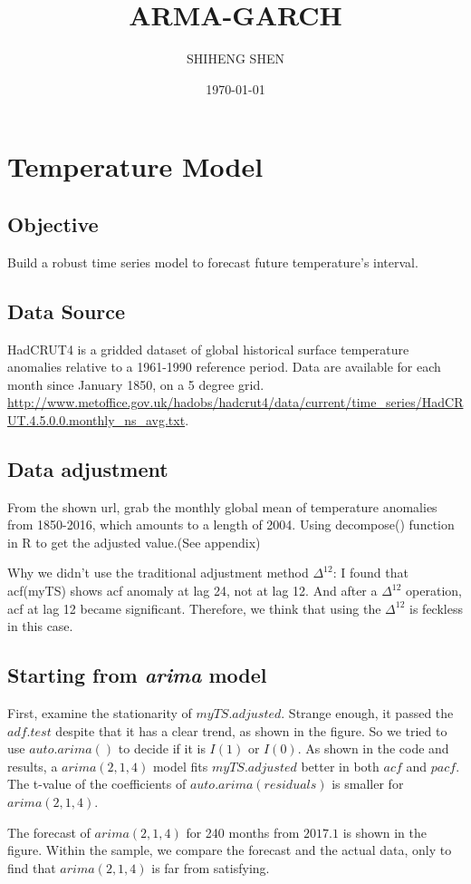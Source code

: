\documentclass[a4paper,10pt]{article}
\title{ARMA-GARCH}
\author{SHIHENG SHEN}
\date{\today}
\begin{document}
\maketitle

\section{Temperature Model}
\subsection{Objective}
Build a robust time series model to forecast future temperature's interval. 


\subsection{Data Source}
HadCRUT4 is a gridded dataset of global historical surface temperature anomalies relative to a 1961-1990 reference period. Data are available for each month since January 1850, on a 5 degree grid. \url{http://www.metoffice.gov.uk/hadobs/hadcrut4/data/current/time_series/HadCRUT.4.5.0.0.monthly_ns_avg.txt}.

\subsection{Data adjustment}
From the shown url, grab the monthly global mean of temperature anomalies from 1850-2016, which amounts to a length of 2004. Using decompose() function in R to get the adjusted value.(See appendix)  \par
Why we didn't use the traditional adjustment method $\Delta^{12}$: I found that acf(myTS) shows acf anomaly at lag 24, not at lag 12. And after a $\Delta^{12}$ operation, acf at lag 12 became significant. Therefore, we think that using the $\Delta^{12}$ is feckless in this case.



\subsection{Starting from \textit{arima} model}
First, examine the stationarity of $myTS.adjusted$. Strange enough, it passed the $adf.test$ despite that it has a clear trend, as shown in the figure. So we tried to use $auto.arima()$ to decide if it is $I(1)$ or $I(0)$. As shown in the code and results, a $arima(2, 1, 4)$ model fits $myTS.adjusted$ better in both $acf$ and $pacf$. The t-value of the coefficients of $auto.arima(residuals)$ is smaller for $arima(2, 1, 4)$.\par
The forecast of $arima(2, 1, 4)$ for 240 months from $2017.1$ is shown in the figure. Within the sample, we compare the forecast and the actual data, only to find that $arima(2, 1, 4)$ is far from satisfying. 
\end{document}
